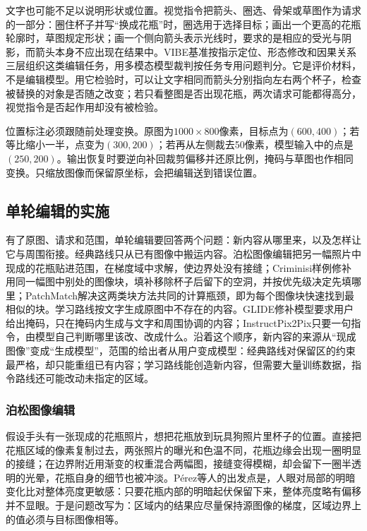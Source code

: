 文字也可能不足以说明形状或位置。视觉指令把箭头、圈选、骨架或草图作为请求的一部分：圈住杯子并写“换成花瓶”时，圈选用于选择目标；画出一个更高的花瓶轮廓时，草图规定形状；画一个侧向箭头表示光线时，要求的是相应的受光与阴影，而箭头本身不应出现在结果中。VIBE基准按指示定位、形态修改和因果关系三层组织这类编辑任务，用多模态模型裁判按任务专用问题判分。它是评价材料，不是编辑模型。用它检验时，可以让文字相同而箭头分别指向左右两个杯子，检查被替换的对象是否随之改变；若只看整图是否出现花瓶，两次请求可能都得高分，视觉指令是否起作用却没有被检验。

位置标注必须跟随前处理变换。原图为$1000\times800$像素，目标点为$(600,400)$；若等比缩小一半，点变为$(300,200)$；若再从左侧裁去50像素，模型输入中的点是$(250,200)$。输出恢复时要逆向补回裁剪偏移并还原比例，掩码与草图也作相同变换。只缩放图像而保留原坐标，会把编辑送到错误位置。

\subsection{单轮编辑的实施}
\label{sec:vision-generation-editing-methods}

有了原图、请求和范围，单轮编辑要回答两个问题：新内容从哪里来，以及怎样让它与周围衔接。经典路线只从已有图像中搬运内容。泊松图像编辑把另一幅照片中现成的花瓶贴进范围，在梯度域中求解，使边界处没有接缝；Criminisi样例修补用同一幅图中别处的图像块，填补移除杯子后留下的空洞，并按优先级决定先填哪里；PatchMatch解决这两类块方法共同的计算瓶颈，即为每个图像块快速找到最相似的块。学习路线按文字生成原图中不存在的内容。GLIDE修补模型要求用户给出掩码，只在掩码内生成与文字和周围协调的内容；InstructPix2Pix只要一句指令，由模型自己判断哪里该改、改成什么。沿着这个顺序，新内容的来源从“现成图像”变成“生成模型”，范围的给出者从用户变成模型：经典路线对保留区的约束最严格，却只能重组已有内容；学习路线能创造新内容，但需要大量训练数据，指令路线还可能改动未指定的区域。

\subsubsection{泊松图像编辑}
\label{sec:vision-generation-poisson}

假设手头有一张现成的花瓶照片，想把花瓶放到玩具狗照片里杯子的位置。直接把花瓶区域的像素复制过去，两张照片的曝光和色温不同，花瓶边缘会出现一圈明显的接缝；在边界附近用渐变的权重混合两幅图，接缝变得模糊，却会留下一圈半透明的光晕，花瓶自身的细节也被冲淡。Pérez等人的出发点是，人眼对局部的明暗变化比对整体亮度更敏感：只要花瓶内部的明暗起伏保留下来，整体亮度略有偏移并不显眼。于是问题改写为：区域内的结果应尽量保持源图像的梯度，区域边界上的值必须与目标图像相等。

